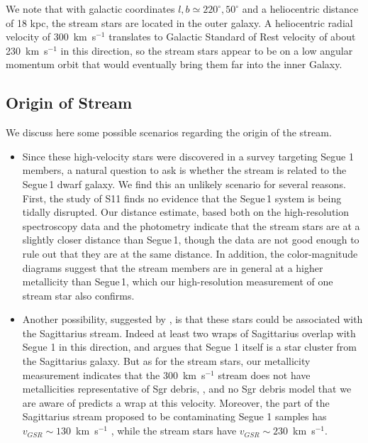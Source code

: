 \documentclass{emulateapj}
\begin{document}
We note that with galactic coordinates $l, b \simeq 220^{\circ}, 50^{\circ}$ and a heliocentric distance of 18 kpc, the stream stars are located in the outer galaxy. A heliocentric radial velocity of 300~km~s$^{-1}$ translates to Galactic Standard of Rest velocity of about 230~km~s$^{-1}$ in this direction, so the stream stars appear to be on a low angular momentum orbit that would eventually bring them far into the inner Galaxy.



\subsection{Origin of Stream}
We discuss here some possible scenarios regarding the origin of the stream.

\begin{itemize}
\item Since these high-velocity stars were discovered in a survey targeting Segue 1 members, a natural question to ask is whether the stream is related to the Segue\,1 dwarf galaxy. We find this an unlikely scenario for several reasons. First, the study of S11 finds no evidence that the Segue\,1 system is being tidally disrupted. Our distance estimate, based both on the high-resolution spectroscopy data and the photometry indicate that the stream stars are at a slightly closer distance than Segue\,1, though the data are not good enough to rule out that they are at the same distance. In addition, the color-magnitude diagrams suggest that the stream members are in general at a higher metallicity than Segue\,1, which our high-resolution measurement of one stream star also confirms. 

\item Another possibility, suggested by \citet{Geha2009}, is that these stars could be associated with the Sagittarius stream. Indeed at least two wraps of Sagittarius overlap with Segue 1 in this direction, and \citet{Niederste-Ostholt2009} argues that Segue 1 itself is a star cluster from the Sagittarius galaxy. But as for the stream stars, our metallicity measurement indicates that the 300~km~s$^{-1}$ stream does not have metallicities representative of Sgr debris, \citep{Chou2007, Casey2012}, and no Sgr debris model that we are aware of predicts a wrap at this velocity. Moreover, the part of the Sagittarius stream proposed to be contaminating Segue 1 samples has $v_{GSR} \sim 130$~km~s$^{-1}$ \citep{Niederste-Ostholt2009}, while the stream stars have $v_{GSR} \sim 230$~km~s$^{-1}$. 


\end{itemize}
\end{document}
